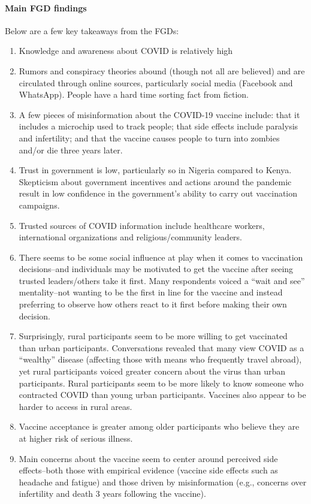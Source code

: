 \documentclass[letterpaper, 12pt, parskip=full,DIV=10]{scrartcl}
\begin{document}
\paragraph{Main FGD findings}

Below are a few key takeaways from the FGDs:
\begin{enumerate}
\item Knowledge and awareness about COVID is relatively high
\item Rumors and conspiracy theories abound (though not all are believed) and are circulated through online sources, particularly social media (Facebook and WhatsApp). People have a hard time sorting fact from fiction. 
\item A few pieces of misinformation about the COVID-19 vaccine include: that it includes a microchip used to track people; that side effects include paralysis and infertility; and that the vaccine causes people to turn into zombies and/or die three years later.
\item Trust in government is low, particularly so in Nigeria compared to Kenya. Skepticism about government incentives and actions around the pandemic result in low confidence in the government's ability to carry out vaccination campaigns.
\item Trusted sources of COVID information include healthcare workers, international organizations and religious/community leaders. 
\item There seems to be some social influence at play when it comes to vaccination decisions--and individuals may be motivated to get the vaccine after seeing trusted leaders/others take it first. Many respondents voiced a ``wait and see'' mentality--not wanting to be the first in line for the vaccine and instead preferring to observe how others react to it first before making their own decision.
\item Surprisingly, rural participants seem to be more willing to get vaccinated than urban participants. Conversations revealed that many view COVID as a ``wealthy'' disease (affecting those with means who frequently travel abroad), yet rural participants voiced greater concern about the virus than urban participants. Rural participants seem to be more likely to know someone who contracted COVID than young urban participants. Vaccines also appear to be harder to access in rural areas.
\item Vaccine acceptance is greater among older participants who believe they are at higher risk of serious illness.
\item Main concerns about the vaccine seem to center around perceived side effects--both those with empirical evidence (vaccine side effects such as headache and fatigue) and those driven by misinformation (e.g., concerns over infertility and death 3 years following the vaccine).
\end{enumerate}
\end{document}
